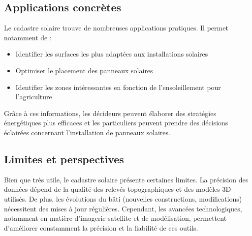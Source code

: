 \subsection{Applications concrètes}
\par{Le cadastre solaire trouve de nombreuses applications pratiques. Il permet notamment de :
\begin{itemize}
    \item Identifier les surfaces les plus adaptées aux installations solaires
    \item Optimiser le placement des panneaux solaires
    \item Identifier les zones intéressantes en fonction de l’ensoleillement pour l'agriculture
\end{itemize}}

\par{Grâce à ces informations, les décideurs peuvent élaborer des stratégies énergétiques plus efficaces et les particuliers peuvent prendre des décisions éclairées concernant l'installation de panneaux solaires.}

\subsection{Limites et perspectives}
\par{Bien que très utile, le cadastre solaire présente certaines limites. La précision des données dépend de la qualité des relevés topographiques et des modèles 3D utilisés. De plus, les évolutions du bâti (nouvelles constructions, modifications) nécessitent des mises à jour régulières. Cependant, les avancées technologiques, notamment en matière d'imagerie satellite et de modélisation, permettent d'améliorer constamment la précision et la fiabilité de ces outils.}

